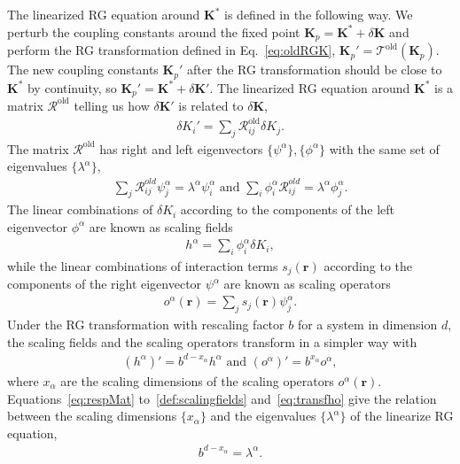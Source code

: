\documentclass[aps,prr,reprint,superscriptaddress,floatfix]{revtex4-2}
\begin{document}
The linearized RG equation around $\mathbf{K}^{*}$ is defined in the following way.
We perturb the coupling constants around the fixed point $\mathbf{K}_p = \mathbf{K}^{*} + \delta \mathbf{K}$ and perform the RG transformation defined in Eq.~\eqref{eq:oldRGK}, $\mathbf{K}_p' = \mathcal{T}^{\text{old}}\left(\mathbf{K}_p\right)$. 
The new coupling constants $\mathbf{K}_p'$ after the RG transformation should be close to $\mathbf{K}^{*}$ by continuity, so $\mathbf{K}_p' = \mathbf{K}^{*} + \delta \mathbf{K}'$.
The linearized RG equation around $\mathbf{K}^{*}$ is a matrix $\mathcal{R}^{\text{old}}$ telling us how $\delta \mathbf{K}'$ is related to $\delta \mathbf{K}$,
%
\begin{align}\label{eq:respMat}
    \delta K_i' = \sum_j\mathcal{R}^{\text{old}}_{ij} \delta K_j.
\end{align}
%
The matrix $\mathcal{R}^{\text{old}}$ has right and left eigenvectors $\{\psi^{\alpha}\}, \{\phi^{\alpha}\}$ with the same set of eigenvalues $\{\lambda^{\alpha}\}$,
%
\begin{align}\label{eq:eigsofRespM}
    \sum_j \mathcal{R}^{old}_{ij} \psi^{\alpha}_j = \lambda^{\alpha}
    \psi^{\alpha}_i \text{ and } \sum_i \phi^{\alpha}_i
    \mathcal{R}^{old}_{ij} = \lambda^{\alpha} \phi^{\alpha}_j.
\end{align}
%
The linear combinations of $\delta K_i$ according to the components of the left eigenvector $\phi^{\alpha}$ are known as scaling fields
%
\begin{align}\label{def:scalingfields}
    h^{\alpha} = \sum_i \phi^{\alpha}_i \delta K_i,
\end{align}
%
while the linear combinations of interaction terms $s_j(\mathbf{r})$ according to the components of the right eigenvector $\psi^{\alpha}$ are known as scaling operators
%
\begin{align}\label{def:scalingOpt}
    o^{\alpha}(\mathbf{r}) = \sum_j s_j(\mathbf{r}) \psi^{\alpha}_j.
\end{align}
%
Under the RG transformation with rescaling factor $b$ for a system in dimension $d$, the scaling fields and the scaling operators transform in a simpler way with 
%
\begin{align}\label{eq:transfho}
    \left(h^{\alpha} \right)' = b^{d - x_{\alpha}} h^{\alpha} \text{ and }
    \left(o^{\alpha}\right)' = b^{x_{\alpha}} o^{\alpha},
\end{align}
where $x_{\alpha}$ are the scaling dimensions of the scaling operators $o^{\alpha}(\mathbf{r})$. 
Equations~\eqref{eq:respMat} to~\eqref{def:scalingfields} and~\eqref{eq:transfho} give the relation between the scaling dimensions $\{x_{\alpha}\}$ and the eigenvalues $\{\lambda^{\alpha}\}$ of the linearize RG equation, 
%
\begin{align}\label{eq:lambda2x}
    b^{d-x_{\alpha}} = \lambda^{\alpha}.
\end{align}
%
\end{document}
